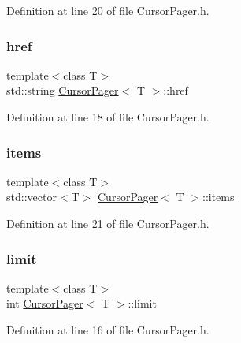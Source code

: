 Definition at line 20 of file Cursor\+Pager.\+h.

\mbox{\label{class_cursor_pager_a0899805bbf2a0e7a1db0dce4eec79a11}} 
\subsubsection{\texorpdfstring{href}{href}}
{\footnotesize\ttfamily template$<$class T$>$ \\
std\+::string \mbox{\hyperlink{class_cursor_pager}{Cursor\+Pager}}$<$ T $>$\+::href\hspace{0.3cm}{\ttfamily [private]}}



Definition at line 18 of file Cursor\+Pager.\+h.

\mbox{\label{class_cursor_pager_a086865ec09d59948bd89220d974023d3}} 
\subsubsection{\texorpdfstring{items}{items}}
{\footnotesize\ttfamily template$<$class T$>$ \\
std\+::vector$<$T$>$ \mbox{\hyperlink{class_cursor_pager}{Cursor\+Pager}}$<$ T $>$\+::items\hspace{0.3cm}{\ttfamily [private]}}



Definition at line 21 of file Cursor\+Pager.\+h.

\mbox{\label{class_cursor_pager_aeb9a63e4c2d54f64c00fd95d02efc2f7}} 
\subsubsection{\texorpdfstring{limit}{limit}}
{\footnotesize\ttfamily template$<$class T$>$ \\
int \mbox{\hyperlink{class_cursor_pager}{Cursor\+Pager}}$<$ T $>$\+::limit\hspace{0.3cm}{\ttfamily [private]}}



Definition at line 16 of file Cursor\+Pager.\+h.


